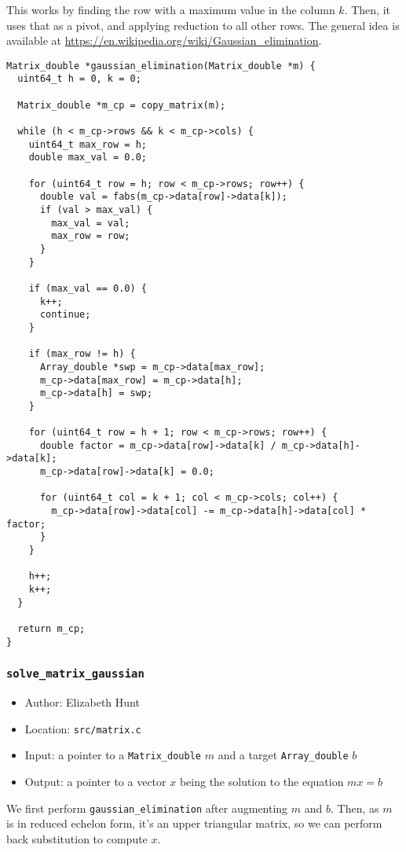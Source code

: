 \documentclass[11pt]{article}
\begin{document}
This works by finding the row with a maximum value in the column \(k\). Then, it uses that as a pivot, and
applying reduction to all other rows. The general idea is available at \url{https://en.wikipedia.org/wiki/Gaussian\_elimination}.

\begin{verbatim}
Matrix_double *gaussian_elimination(Matrix_double *m) {
  uint64_t h = 0, k = 0;

  Matrix_double *m_cp = copy_matrix(m);

  while (h < m_cp->rows && k < m_cp->cols) {
    uint64_t max_row = h;
    double max_val = 0.0;

    for (uint64_t row = h; row < m_cp->rows; row++) {
      double val = fabs(m_cp->data[row]->data[k]);
      if (val > max_val) {
        max_val = val;
        max_row = row;
      }
    }

    if (max_val == 0.0) {
      k++;
      continue;
    }

    if (max_row != h) {
      Array_double *swp = m_cp->data[max_row];
      m_cp->data[max_row] = m_cp->data[h];
      m_cp->data[h] = swp;
    }

    for (uint64_t row = h + 1; row < m_cp->rows; row++) {
      double factor = m_cp->data[row]->data[k] / m_cp->data[h]->data[k];
      m_cp->data[row]->data[k] = 0.0;

      for (uint64_t col = k + 1; col < m_cp->cols; col++) {
        m_cp->data[row]->data[col] -= m_cp->data[h]->data[col] * factor;
      }
    }

    h++;
    k++;
  }

  return m_cp;
}
\end{verbatim}

\subsubsection{\texttt{solve\_matrix\_gaussian}}
\label{sec:org230915f}
\begin{itemize}
\item Author: Elizabeth Hunt
\item Location: \texttt{src/matrix.c}
\item Input: a pointer to a \texttt{Matrix\_double} \(m\) and a target \texttt{Array\_double} \(b\)
\item Output: a pointer to a vector \(x\) being the solution to the equation \(mx = b\)
\end{itemize}

We first perform \texttt{gaussian\_elimination} after augmenting \(m\) and \(b\). Then, as \(m\) is in reduced echelon form, it's an upper
triangular matrix, so we can perform back substitution to compute \(x\).
\end{document}
